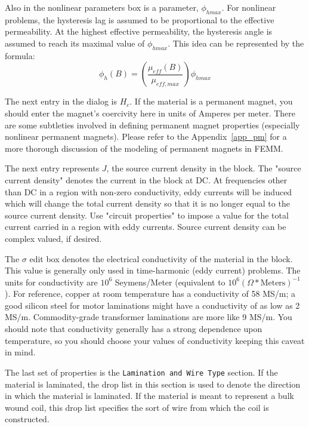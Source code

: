 \documentclass[12pt]{report}
\newcommand{\be}{\begin{equation}}
\newcommand{\ee}{\end{equation}}
\begin{document}
Also in the nonlinear parameters box is a parameter, $\phi_{hmax}$.  For
nonlinear problems, the hysteresis lag is assumed to be proportional to the
effective permeability.  At the highest effective permeability, the
hysteresis angle is assumed to reach its maximal value of $\phi_{hmax}$.
This idea can be represented by the formula:
\be \phi_h(B)= \left( \frac{\mu_{eff}(B) }{\mu_{eff,max}} \right) \phi_{hmax} \ee


The next entry in the dialog is $H_c$.  If the material is a permanent
magnet, you should enter the magnet's coercivity here in units of Amperes
per meter.  There are some subtleties involved in defining
permanent magnet properties (especially nonlinear permanent magnets).
Please refer to the Appendix~\ref{app_pm} for a more thorough discussion of
the modeling of permanent magnets in FEMM.

The next entry represents $J$, the source current density in the block. The "source current density"
denotes the current in the block at DC.  At frequencies other than DC in a region with non-zero conductivity,
eddy currents will be induced which will change the total current density so that it is no longer equal to the
source current density.  Use "circuit properties" to impose a value for the total current carried in a region
with eddy currents. Source current density can be complex valued, if desired.

The $\sigma$ edit box denotes the electrical conductivity of the
material in the block. This value is generally only used in
time-harmonic (eddy current) problems. The units for conductivity
are $10^6$ Seymens/Meter (equivalent to $10^6
(\Omega*\mbox{Meters})^{-1}$). For reference, copper at room
temperature has a conductivity of 58 MS/m; a good silicon steel for
motor laminations might have a conductivity of as low as 2 MS/m.
Commodity-grade transformer laminations are more like 9 MS/m. You
should note that conductivity generally has a strong dependence
upon temperature, so you should choose your values of conductivity
keeping this caveat in mind.

The last set of properties is the {\tt Lamination and Wire Type} section.
If the material is laminated, the drop list in this section is used to
denote the  direction in which the material is laminated.
If the material is meant to represent a bulk wound coil, this drop
list specifies the sort of wire from which the coil is constructed.
\end{document}
